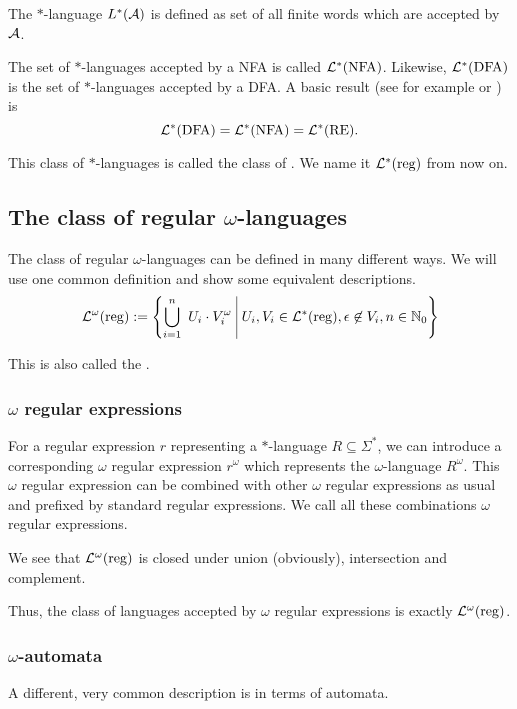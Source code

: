 The $*$-language $L^*(\mathcal{A})$ is defined as set of all finite words which are accepted by $\mathcal{A}$.

The set of $*$-languages accepted by a NFA is called $\mathcal{L}^*(\text{NFA})$. Likewise, $\mathcal{L}^*(\text{DFA})$ is the set of $*$-languages accepted by a DFA. A basic result (see for example \cite{FinAutLogR109} or \cite{InfWordsR110}) is
\[ \mathcal{L}^*(\text{DFA}) = \mathcal{L}^*(\text{NFA}) = \mathcal{L}^*(\text{RE}) . \]

This class of $*$-languages is called the class of . We name it $\mathcal{L}^*(\textup{\textrm{reg}})$ from now on.



\subsection{The class of regular $\omega$-languages}
\label{reg-omega-lang}

The class of regular $\omega$-languages can be defined in many different ways. We will use one common definition and show some equivalent descriptions.
\[ \LangOreg := \Set{ \bigcup_{i=1}^n\ U_i \cdot V_i^\omega }{ U_i, V_i \in \Langreg, \epsilon \not\in V_i, n \in \N_0 } \]

This is also called the .

\subsubsection{$\omega$ regular expressions}

For a regular expression $r$ representing a $*$-language $R\subseteq \Sigma^*$, we can introduce a corresponding $\omega$ regular expression $r^\omega$ which represents the $\omega$-language $R^\omega$. This $\omega$ regular expression can be combined with other $\omega$ regular expressions as usual and prefixed by standard regular expressions. We call all these combinations $\omega$ regular expressions.

We see that $\mathcal{L}^\omega(\textup{\textrm{reg}})$ is closed under union (obviously), intersection and complement.

Thus, the class of languages accepted by $\omega$ regular expressions is exactly $\mathcal{L}^\omega(\textup{\textrm{reg}})$.


\subsubsection{$\omega$-automata}

A different, very common description is in terms of automata.

